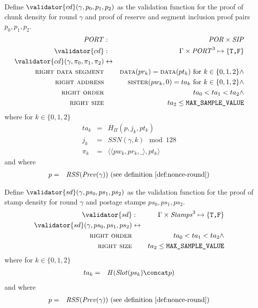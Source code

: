 \begin{definition}
\label{def:chunk-density-validition}
%
Define $\validator{cd}(\gamma, p_0,p_1,p_2)$ as the validation function for the proof of chunk density for round $\gamma$ and proof of reserve and segment inclusion proof pairs $p_0,p_1,p_2$.
%
\begin{eqnarray}
\mathit{PORT}&:&\mathit{POR}\times\mathit{SIP}\\
\validator{cd}&:&\Gamma\times\mathit{PORT}^3\mapsto\{\texttt{T,F}\}\\
\validator{cd}(\gamma, \pi_0,\pi_1,\pi_2)&\leftrightarrow&\\
\textsc{right data segment}&&   \textsc{data}(pr_k)= \textsc{data}(pt_k)\text{ for }k\in\{0,1,2\}\land\\
\textsc{right address}&& \textsc{sister}(pw_k,0)=ta_k\text{ for }k\in\{0,1,2\}\land\\
\textsc{right order}&& ta_0<ta_1<ta_2\land\\
\textsc{right size}&& ta_2\leq\texttt{MAX\_SAMPLE\_VALUE}
\end{eqnarray}
where  for $k\in\{0,1,2\}$
\begin{eqnarray}
ta_k& = & \mathit{H}_{\Pi}(p,j_k,pt_k)\\
j_k& = &\mathit{SSN}(\gamma,k)\mod 128\\
\pi_k&=& \langle\langle pw_k, pr_k, \_\rangle, pt_k\rangle
\end{eqnarray}
and where
\begin{eqnarray}
p & = & \mathit{RSS}(\mathit{Prev}(\gamma)) \text{ (see definition \ref{def:nonce-round})}
\end{eqnarray}
\end{definition}

\begin{definition}
\label{def:stamp-density-validition}
%
Define $\validator{sd}(\gamma, ps_0,ps_1,ps_2)$ as the validation function for the proof of stamp density for round $\gamma$ and postage stamps $ps_0,ps_1,ps_2$.
%
\begin{eqnarray}
\validator{sd}&:&\Gamma\times\mathit{Stamps}^3\mapsto\{\texttt{T,F}\}\\
\validator{sd}(\gamma, ps_0,ps_1,ps_2)&\leftrightarrow &\\ 
\textsc{right order}&& ta_0<ta_1<ta_2\land\\
\textsc{right size}&& ta_2\leq\texttt{MAX\_SAMPLE\_VALUE}
\end{eqnarray}
where for $k\in\{0,1,2\}$
\begin{eqnarray}
ta_k& =& \mathit{H}(\mathit{Slot}(ps_k)\concat p)
\end{eqnarray}
and where
\begin{eqnarray}
p & = & \mathit{RSS}(\mathit{Prev}(\gamma)) \text{ (see definition \ref{def:nonce-round})}
\end{eqnarray}
\end{definition}

